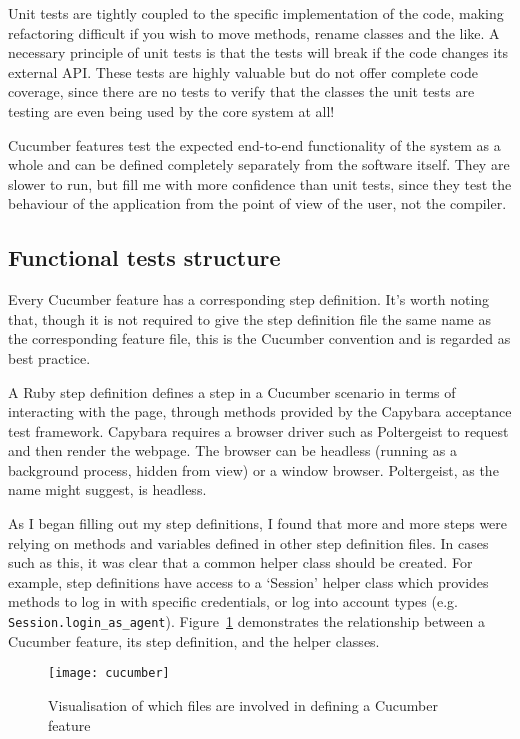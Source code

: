 Unit tests are tightly coupled to the specific implementation of the code, making refactoring difficult if you wish to move methods, rename classes and the like. A necessary principle of unit tests is that the tests will break if the code changes its external API. These tests are highly valuable but do not offer complete code coverage, since there are no tests to verify that the classes the unit tests are testing are even being used by the core system at all!

Cucumber features test the expected end-to-end functionality of the system as a whole and can be defined completely separately from the software itself. They are slower to run, but fill me with more confidence than unit tests, since they test the behaviour of the application from the point of view of the user, not the compiler.

\subsection{Functional tests structure}

Every Cucumber feature has a corresponding step definition. It's worth noting that, though it is not required to give the step definition file the same name as the corresponding feature file, this is the Cucumber convention and is regarded as best practice.

A Ruby step definition defines a step in a Cucumber scenario in terms of interacting with the page, through methods provided by the Capybara acceptance test framework. Capybara requires a browser driver such as Poltergeist to request and then render the webpage. The browser can be headless (running as a background process, hidden from view) or a window browser. Poltergeist, as the name might suggest, is headless.

As I began filling out my step definitions, I found that more and more steps were relying on methods and variables defined in other step definition files. In cases such as this, it was clear that a common helper class should be created. For example, step definitions have access to a `Session' helper class which provides methods to log in with specific credentials, or log into account types (e.g. \lstinline{Session.login_as_agent}). Figure~\ref{uml:cucumber} demonstrates the relationship between a Cucumber feature, its step definition, and the helper classes.

\begin{figure}[h!]
  \centering
    \ifimages
    \texttt{[image: cucumber]}
    \fi
  \caption{Visualisation of which files are involved in defining a Cucumber feature}
  \label{uml:cucumber}
\end{figure}

